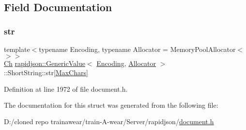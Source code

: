 \subsection{Field Documentation}
\mbox{\label{structrapidjson_1_1_generic_value_1_1_short_string_af01f91b1cd1ed9a53a7dc2eb9022c1e0}} 
\subsubsection{\texorpdfstring{str}{str}}
{\footnotesize\ttfamily template$<$typename Encoding, typename Allocator = Memory\+Pool\+Allocator$<$$>$$>$ \\
\mbox{\hyperlink{classrapidjson_1_1_generic_value_adcdbc7fa85a9a41b78966d7e0dcc2ac4}{Ch}} \mbox{\hyperlink{classrapidjson_1_1_generic_value}{rapidjson\+::\+Generic\+Value}}$<$ \mbox{\hyperlink{classrapidjson_1_1_encoding}{Encoding}}, \mbox{\hyperlink{classrapidjson_1_1_allocator}{Allocator}} $>$\+::Short\+String\+::str\mbox{[}\mbox{\hyperlink{structrapidjson_1_1_generic_value_1_1_short_string_a77aa02281a84b131e4d4eb3a13146815a78cfea23edd64c3767922023807ced64}{Max\+Chars}}\mbox{]}}



Definition at line 1972 of file document.\+h.



The documentation for this struct was generated from the following file\+:\begin{DoxyCompactItemize}
\item 
D\+:/cloned repo trainawear/train-\/\+A-\/wear/\+Server/rapidjson/\mbox{\hyperlink{document_8h}{document.\+h}}\end{DoxyCompactItemize}
